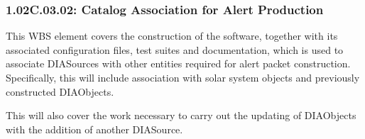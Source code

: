 \subsubsection*{1.02C.03.02: Catalog Association for Alert Production}

This WBS element covers the construction of the software,
together with its associated configuration files, test suites and
documentation, which is used to associate
DIASources with other entities required for alert packet construction.
Specifically, this will include association with solar system objects
and previously constructed DIAObjects.

This will also cover the work necessary to carry out the updating
of DIAObjects with the addition of another DIASource.
